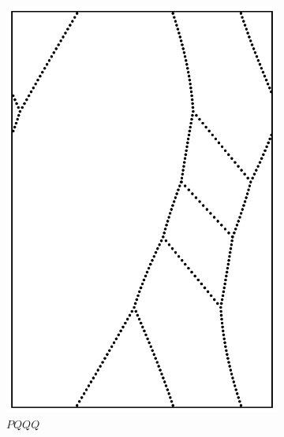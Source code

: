 \documentclass[12pt,twoside]{reedthesis}
\theoremstyle{definition}
\begin{document}
\begin{figure}[h]
\begin{subfigure}[t]{0.24\textwidth}
    \includegraphics[width=\textwidth]{figures/string_cheese_appendix/pqqq.pdf}
    \caption*{$PQQQ$}
    \vspace{5mm}
  \end{subfigure}
  \hfill
  \begin{subfigure}[t]{0.24\textwidth}

\end{subfigure}
\end{figure}
\end{document}
